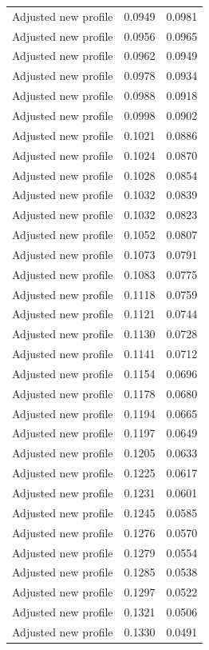 \begin{table}[htbp]
\begin{tabular}{lll}
Adjusted new profile & 0.0949 & 0.0981 \\
Adjusted new profile & 0.0956 & 0.0965 \\
Adjusted new profile & 0.0962 & 0.0949 \\
Adjusted new profile & 0.0978 & 0.0934 \\
Adjusted new profile & 0.0988 & 0.0918 \\
Adjusted new profile & 0.0998 & 0.0902 \\
Adjusted new profile & 0.1021 & 0.0886 \\
Adjusted new profile & 0.1024 & 0.0870 \\
Adjusted new profile & 0.1028 & 0.0854 \\
Adjusted new profile & 0.1032 & 0.0839 \\
Adjusted new profile & 0.1032 & 0.0823 \\
Adjusted new profile & 0.1052 & 0.0807 \\
Adjusted new profile & 0.1073 & 0.0791 \\
Adjusted new profile & 0.1083 & 0.0775 \\
Adjusted new profile & 0.1118 & 0.0759 \\
Adjusted new profile & 0.1121 & 0.0744 \\
Adjusted new profile & 0.1130 & 0.0728 \\
Adjusted new profile & 0.1141 & 0.0712 \\
Adjusted new profile & 0.1154 & 0.0696 \\
Adjusted new profile & 0.1178 & 0.0680 \\
Adjusted new profile & 0.1194 & 0.0665 \\
Adjusted new profile & 0.1197 & 0.0649 \\
Adjusted new profile & 0.1205 & 0.0633 \\
Adjusted new profile & 0.1225 & 0.0617 \\
Adjusted new profile & 0.1231 & 0.0601 \\
Adjusted new profile & 0.1245 & 0.0585 \\
Adjusted new profile & 0.1276 & 0.0570 \\
Adjusted new profile & 0.1279 & 0.0554 \\
Adjusted new profile & 0.1285 & 0.0538 \\
Adjusted new profile & 0.1297 & 0.0522 \\
Adjusted new profile & 0.1321 & 0.0506 \\
Adjusted new profile & 0.1330 & 0.0491 \\

\end{tabular}
\end{table}
